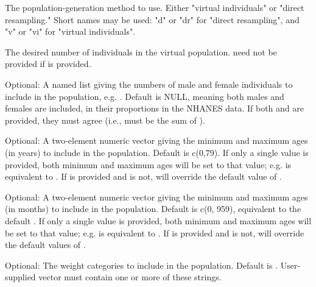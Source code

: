 \documentclass[a4paper]{book}
\begin{document}
\begin{Arguments}
\begin{ldescription}
\item[\code{method}] The population-generation method to use. Either "virtual
individuals" or "direct resampling." Short names may be used: "d" or "dr"
for "direct resampling", and "v" or "vi" for "virtual individuals".

\item[\code{nsamp}] The desired number of individuals in the virtual population.
 need not be provided if  is provided.

\item[\code{gendernum}] Optional: A named list giving the numbers of male and
female individuals to include in the population, e.g. . Default is NULL, meaning both males and females are included,
in their proportions in the NHANES data. If both  and
 are provided, they must agree (i.e.,  must be
the sum of ).

\item[\code{agelim\_years}] Optional: A two-element numeric vector giving the
minimum and maximum ages (in years) to include in the population. Default is
c(0,79). If only a single value is provided, both minimum and maximum ages
will be set to that value; e.g.  is equivalent to
. If  is provided and
 is not,  will override the default
value of .

\item[\code{agelim\_months}] Optional: A two-element numeric vector giving the
minimum and maximum ages (in months) to include in the population. Default
is c(0, 959), equivalent to the default . If only a
single value is provided, both minimum and maximum ages will be set to that
value; e.g.  is equivalent to
. If  is provided and
 is not,  will override the default
values of .

\item[\code{weight\_category}] Optional: The weight categories to include in the
population. Default is . User-supplied vector must contain one or more of these strings.


\end{ldescription}
\end{Arguments}
\end{document}
